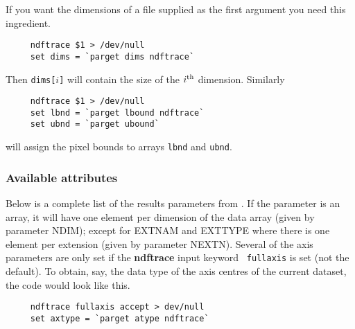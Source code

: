If you want the dimensions of a  file
supplied as the first argument you need this ingredient.

\small
\begin{verbatim}
     ndftrace $1 > /dev/null
     set dims = `parget dims ndftrace`
\end{verbatim}
\normalsize
Then {\tt dims[$i$]} will contain the size of the $i^{\rm th}$
dimension.  Similarly

\small
\begin{verbatim}
     ndftrace $1 > /dev/null
     set lbnd = `parget lbound ndftrace`
     set ubnd = `parget ubound`
\end{verbatim}
\normalsize
will assign the pixel bounds to arrays {\tt lbnd} and {\tt ubnd}.

\subsubsection{Available attributes
\label{sc4_se_dataset_atlist}}

Below is a complete list of the results parameters from
.  If the parameter is an array,
it will have one element per dimension of the data array (given by
parameter NDIM); except for EXTNAM and EXTTYPE where there is one
element per extension (given by parameter NEXTN). Several of the axis
parameters are only set if the {\bf ndftrace} input keyword {\tt
fullaxis} is set (not the default).  To obtain, say, the data type of
the axis centres of the current dataset, the code would look like
this.

\small
\begin{verbatim}
     ndftrace fullaxis accept > dev/null
     set axtype = `parget atype ndftrace`
\end{verbatim}
\normalsize

